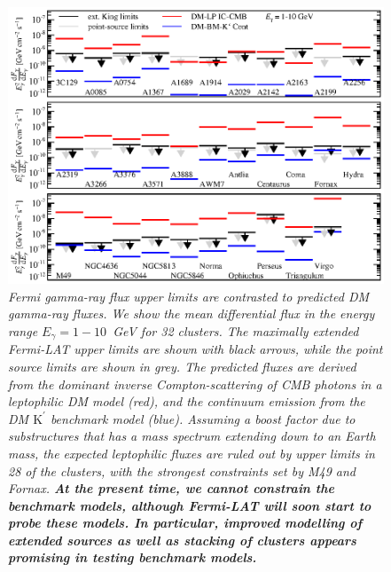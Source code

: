 \documentclass[10pt,aps,pra,reprint,amsmath,amsfonts,amssymb,showpacs,nofootinbib,floatfix]{revtex4-1}
\def\C#1{{\bf #1}}
\newcommand{\Fermi}{{\em Fermi}\xspace}
\newcommand{\rmn}{\mathrm}
\newcommand{\Kp}{\rmn{K}^\prime}
\begin{document}
\begin{figure}
\begin{minipage}{2.0\columnwidth}
  \includegraphics[width=0.99\columnwidth]{figures/Fermi.comp.DM.eps}
  \caption{\it \Fermi gamma-ray flux upper limits are contrasted to
    predicted DM gamma-ray fluxes. We show the mean differential flux
    in the energy range $E_\gamma=1-10$~GeV for 32 clusters. The
    maximally extended \Fermi-LAT upper limits are shown with black
    arrows, while the point source limits are shown in grey. The
    predicted fluxes are derived from the dominant inverse
    Compton-scattering of CMB photons in a leptophilic DM model (red),
    and the continuum emission from the DM $\Kp$ benchmark model
    (blue). Assuming a boost factor due to substructures that has a
    mass spectrum extending down to an Earth mass, the expected
    leptophilic fluxes are ruled out by upper limits in 28 of the
    clusters, with the strongest constraints set by M49 and
    Fornax. \C{At the present time, we cannot constrain the benchmark
      models, although \Fermi-LAT will soon start to probe these
      models. In particular, improved modelling of extended sources as
      well as stacking of clusters appears promising in testing
      benchmark models.}}
 \label{fig14}
\end{minipage}
\end{figure}
\end{document}
